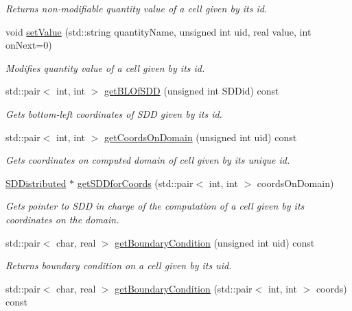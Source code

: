 \begin{DoxyCompactItemize}
\begin{DoxyCompactList}\small\item\em Returns non-\/modifiable quantity value of a cell given by its id. \end{DoxyCompactList}\item 
void \hyperlink{classDomain_a9319e738fbd4ada8145998d5392c9334}{set\+Value} (std\+::string quantity\+Name, unsigned int uid, real value, int on\+Next=0)
\begin{DoxyCompactList}\small\item\em Modifies quantity value of a cell given by its id. \end{DoxyCompactList}\item 
std\+::pair$<$ int, int $>$ \hyperlink{classDomain_a9dd93464e05e2a631f01cc30277db885}{get\+B\+L\+Of\+S\+DD} (unsigned int S\+D\+Did) const
\begin{DoxyCompactList}\small\item\em Gets bottom-\/left coordinates of S\+DD given by its id. \end{DoxyCompactList}\item 
std\+::pair$<$ int, int $>$ \hyperlink{classDomain_a7eba31dcda6d3a45f41a3839a34706c8}{get\+Coords\+On\+Domain} (unsigned int uid) const
\begin{DoxyCompactList}\small\item\em Gets coordinates on computed domain of cell given by its unique id. \end{DoxyCompactList}\item 
\hyperlink{classSDDistributed}{S\+D\+Distributed} $\ast$ \hyperlink{classDomain_a893851a7caff52261beb79888d46be1f}{get\+S\+D\+Dfor\+Coords} (std\+::pair$<$ int, int $>$ coords\+On\+Domain)
\begin{DoxyCompactList}\small\item\em Gets pointer to S\+DD in charge of the computation of a cell given by its coordinates on the domain. \end{DoxyCompactList}\item 
std\+::pair$<$ char, real $>$ \hyperlink{classDomain_a23641933f63bd9b7ff51ee67791823b4}{get\+Boundary\+Condition} (unsigned int uid) const
\begin{DoxyCompactList}\small\item\em Returns boundary condition on a cell given by its uid. \end{DoxyCompactList}\item 
std\+::pair$<$ char, real $>$ \hyperlink{classDomain_aeb1110620465fc735aac4f37962fbf3d}{get\+Boundary\+Condition} (std\+::pair$<$ int, int $>$ coords) const

\end{DoxyCompactItemize}
